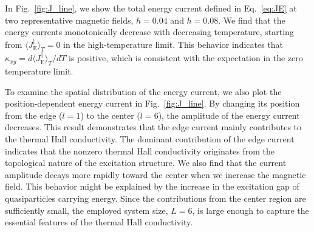 \documentclass[twocolumn,superscriptaddress,showpacs, longbibliography, aps, prb]{revtex4-2}
\newcommand{\red}[1]{\textcolor{red}{#1}}
\newcommand{\blue}[1]{\textcolor{blue}{#1}}
\newcommand{\orange}[1]{\textcolor{orange}{#1}}
\begin{document}
In Fig.~\ref{fig:J_line}, we show the total energy current defined in Eq.~\eqref{eq:JE} 
at two representative magnetic fields, $h=0.04$ and $h=0.08$. 
We find that the energy currents monotonically decrease 
with decreasing temperature, starting from $\langle J_{\mathrm{E}}^{\parallel} \rangle_T %
=0$ in the high-temperature limit. This behavior indicates that $\kappa_{xy}=d \langle J_{\mathrm{E}}^{\parallel} \rangle_T %
/d T$ 
is positive, %
which is consistent with the expectation %
in the zero temperature limit. 

To examine the spatial distribution of the energy current,
we also plot the position-dependent energy current in Fig.~\ref{fig:J_line}. 
By changing its position
from the edge %
($l=1$) to the center ($l=6$), 
the amplitude of the energy current decreases.
This result demonstrates that the edge current mainly contributes
to the thermal Hall conductivity. 
The dominant contribution of the edge current %
indicates that the nonzero thermal Hall conductivity %
originates from
the topological nature of the excitation structure. %
We also %
find that %
the current amplitude decays more rapidly toward the center %
when we increase the magnetic field. 
This behavior might be explained by the increase in the excitation gap of quasiparticles carrying energy. %
Since the contributions from the center region are sufficiently small, 
the employed system size, $L=6$, %
is %
large enough to capture the %
essential features of the thermal Hall conductivity.
\end{document}
